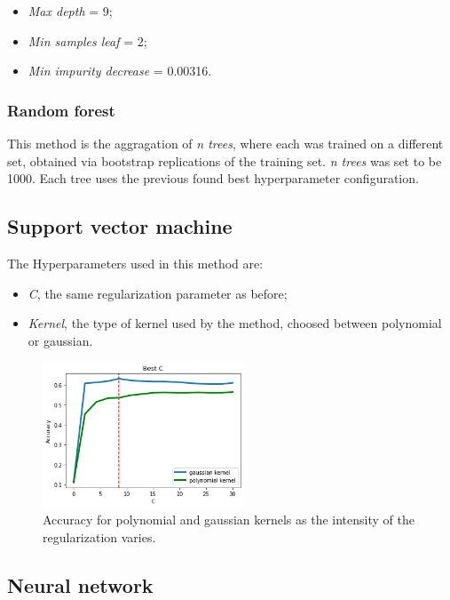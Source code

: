 \documentclass[10pt,twocolumn,letterpaper]{article}
\begin{document}
\begin{itemize}
	\item \textit{Max depth} = 9;
	\item \textit{Min samples leaf} = 2;
	\item \textit{Min impurity decrease} = 0.00316.
\end{itemize}

\subsubsection{Random forest}
This method is the aggragation of \textit{n trees}, where each was trained on a different set, obtained via bootstrap replications of the training set. \textit{n trees} was set to be 1000. Each tree uses the previous found best hyperparameter configuration.

\subsection{Support vector machine}
The Hyperparameters used in this method are:
\begin{itemize}
	\item \textit{C}, the same regularization parameter as before;
	\item \textit{Kernel}, the type of kernel used by the method, choosed between polynomial or gaussian.
\end{itemize}
\begin{figure}[h!]
	\centering
	\includegraphics[width=6cm]{SVM.png}
	\caption{Accuracy for polynomial and gaussian kernels as the intensity of the regularization varies.}
	\label{SVM.png}
\end{figure}
\subsection{Neural network}








%
%

\newpage

\printbibliography
\end{document}
